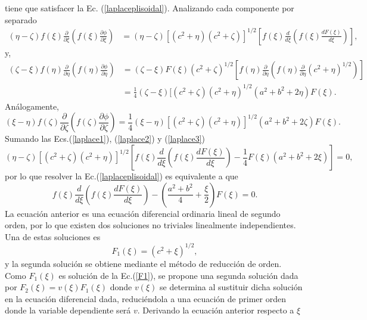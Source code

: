  tiene que satisfacer la Ec. (\ref{laplaceplisoidal}). Analizando cada componente por separado
\begin{align}
     (\eta-\zeta)f(\xi)\frac{\partial}{\partial\xi}\left(f(\xi)\frac{\partial\phi}{\partial\xi}\right)&= (\eta-\zeta)[(c^2+\eta)(c^2+\zeta)]^{1/2}\left[f(\xi)\frac{d}{d\xi}\left(f(\xi)\frac{ d F(\xi)}{d\xi}\right)\right],\label{laplace1}
\end{align}
y,
\begin{align}
    (\zeta-\xi)f(\eta)\frac{\partial}{\partial\eta}\left(f(\eta)\frac{\partial\phi}{\partial\eta}\right)&=(\zeta-\xi)F(\xi)(c^2+\zeta)^{1/2}\left[f(\eta)\frac{\partial}{\partial\eta}\left(f(\eta)\frac{\partial}{\partial\eta}(c^2+\eta)^{1/2}\right)\right]\nonumber\\
    &=\frac{1}{4}(\zeta-\xi)[(c^2+\zeta)(c^2+\eta)^{1/2}(a^2+b^2+2\eta)F(\xi).\label{laplace2}
\end{align}
Análogamente,
\begin{equation}
    (\xi-\eta)f(\zeta)\frac{\partial}{\partial\zeta}\left(f(\zeta)\frac{\partial\phi}{\partial\zeta}\right)=\frac{1}{4}(\xi-\eta)[(c^2+\zeta)(c^2+\eta)]^{1/2}(a^2+b^2+2\zeta)F(\xi).\label{laplace3}
\end{equation}
Sumando las Ecs.(\ref{laplace1}), (\ref{laplace2}) y (\ref{laplace3}) 
\begin{equation}
  (\eta-\zeta)[(c^2+\zeta)(c^2+\eta)]^{1/2}\left[f(\xi)\frac{d}{d\xi}\left(f(\xi)\frac{ d F(\xi)}{d\xi}\right)-\frac{1}{4}F(\xi)(a^2+b^2+2\xi)\right]=0,
\end{equation}
por lo que resolver la Ec.(\ref{laplaceplisoidal}) es equivalente a que
\begin{equation}
    f(\xi)\frac{d}{d\xi}\left(f(\xi)\frac{ d F(\xi)}{d\xi}\right)-\left(\frac{a^2+b^2}{4}+\frac{\xi}{2}\right)F(\xi)=0.
\end{equation}
La ecuación anterior es una ecuación diferencial ordinaria lineal de segundo orden, por lo que existen dos soluciones no triviales linealmente independientes. Una de estas soluciones es
\begin{equation}
    F_1(\xi)=(c^2+\xi)^{1/2},
    \label{F1}
\end{equation}
y la segunda solución se obtiene mediante el método de reducción de orden. Como $F_1(\xi)$ es solución de la Ec.(\ref{F1}), se propone una segunda solución dada por $F_2(\xi)=v(\xi)F_1(\xi)$ donde $v(\xi)$ se determina al sustituir dicha solución en la ecuación diferencial dada, reduciéndola a una ecuación de primer orden donde la variable dependiente será $v$. Derivando la ecuación anterior respecto a $\xi$
